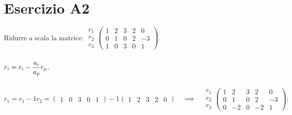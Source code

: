 \documentclass[a4paper]{report}
\newenvironment{problem}
        {
                \begin{mdframed}[topline=false,rightline=false,bottomline=false]
                        \slshape
        }
        {
                \end{mdframed}
        }
\begin{document}
        \chapter*{Esercizio A2}
        \begin{problem}
                Ridurre a scala la matrice:\quad
                $
                        \begin{matrix}r_1 \\ r_2 \\ r_3\end{matrix}
                        \begin{pmatrix}
                               1 & 2 & 3 & 2 &  0 \\
                               0 & 1 & 0 & 2 & -3 \\
                               1 & 0 & 3 & 0 & 1
                        \end{pmatrix}
                $.
        \end{problem}

        \paragraph{}
        $r_i = r_i - \mathlarger{\frac{a_i}{a_p}} r_p$.

        \paragraph{}
        $
                r_1 = r_1 - 1 r_2 = \begin{pmatrix}1 & 0 & 3 & 0 & 1\end{pmatrix} - 1\begin{pmatrix}1 & 2 & 3 & 2 & 0\end{pmatrix}
                \quad \implies \quad
                \begin{matrix}r_1 \\ r_2 \\ r_3\end{matrix}
                \begin{pmatrix}
                        1 & 2  & 3 & 2  &  0 \\
                        0 & 1  & 0 & 2  & -3 \\
                        0 & -2 & 0 & -2 & 1
                \end{pmatrix};
        $
\end{document}
